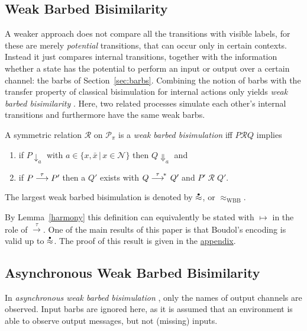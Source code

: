 \documentclass[runningheads]{llncs}
\newcommand{\sect}[1]{Section~\ref{sec:#1}}
\newcommand{\T}{\mathcal{P}}             %
\newcommand{\transtau}{\mathrel{\raisebox{0pt}[8pt][0pt]{$\stackrel{\tau}{\longrightarrow}$}^{\!*\,}}}
\newcommand{\wbb}{\stackrel{\raisebox{-1pt}[0pt][0pt]{$\scriptscriptstyle \bullet$}}{\approx}}
\newcommand{\scomm}{\sbarb}
\newcommand{\sbarb}[1]{{\downarrow_{#1}}}
\newcommand{\ocomm}[1]{{\Downarrow_{#1}}}
\newcommand{\mrel}{\ensuremath{\mathrel{\mathcal{R}}}}
\begin{document}
\subsection{Weak Barbed Bisimilarity}\label{sec:wbb}

A weaker approach does not compare all the transitions with
  visible labels, for these are merely \emph{potential} transitions,
  that can occur only in certain contexts. Instead it just compares
  internal transitions, together with the information whether a state
  has the potential to perform an input or output over a certain channel:
the barbs of \sect{barbs}.
Combining the notion of barbs
with the transfer property of classical bisimulation for internal actions only
yields {\em weak barbed bisimilarity} \cite{milner:poly}.
Here, two related processes simulate each other's internal transitions and
furthermore have the same weak barbs.

\begin{definition}\rm\label{df:WBB}
A symmetric relation {\mrel} on $\T_\pi$ is a {\em weak barbed bisimulation}
iff $P \mrel Q$ implies
\begin{enumerate}
\item if $P \scomm a$ with $a \in \{ x, \bar x \,|\, x \in \mathcal N \}$ then $Q \ocomm a$ and
\item if $P \stackrel{\tau}{\longrightarrow} P'\hspace{-1pt}$ then a $Q'$ exists with
  $Q \transtau Q'\hspace{-1pt}$ and $P'\mathop{\mrel} Q'\!$.%
\end{enumerate}
The largest weak barbed bisimulation is denoted by $\wbb$, or $\approx_{\mathrm{WBB}}$.
\end{definition}
\noindent
By Lemma~\ref{harmony} this definition can equivalently be stated with $\longmapsto$ in the role of $\stackrel{\tau}{\longrightarrow}$.
One of the main results of this paper is that Boudol's encoding is valid up to $\wbb$.
The proof of this result is given in the \hyperlink{appendix}{appendix}.


\subsection{Asynchronous Weak Barbed Bisimilarity}

In {\em asynchronous weak barbed bisimulation} \cite{acs:asynchronous},
only the names of output channels are observed.
Input barbs are ignored here, as it is assumed that an environment
is able to observe output messages, but not (missing) inputs.
\end{document}
